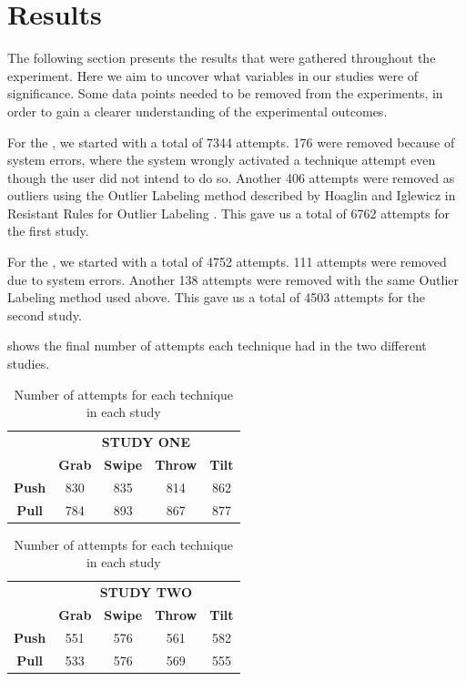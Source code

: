 \section{Results}\label{sec:results}
The following section presents the results that were gathered throughout the experiment.
Here we aim to uncover what variables in our studies were of significance. 
Some data points needed to be removed from the experiments, in order to gain a clearer understanding of the experimental outcomes. 

For the \target, we started with a total of 7344 attempts.
176 were removed because of system errors, where the system wrongly activated a technique attempt even though the user did not intend to do so.
Another 406 attempts were removed as outliers using the Outlier Labeling method described by Hoaglin and Iglewicz in Resistant Rules for Outlier Labeling \cite{Hoaglin:1987}.
This gave us a total of 6762 attempts for the first study.

For the \accuracy, we started with a total of 4752 attempts.
111 attempts were removed due to system errors. 
Another 138 attempts were removed with the same Outlier Labeling method used above.
This gave us a total of 4503 attempts for the second study.

 shows the final number of attempts each technique had in the two different studies.

\begin{table}[H]
	\centering
	\begin{adjustbox}{width=\columnwidth}
		{
			\def\arraystretch{1.5}
			\begin{tabular}{c c c c c}
				& \multicolumn{4}{c}{\textbf{STUDY ONE}} \\
				\cline{2-5}
				& \textbf{Grab} & \textbf{Swipe} & \textbf{Throw} & \textbf{Tilt} \\ \hline
				\textbf{Push} & 830 & 835 & 814 & 862 \\ \hline
				\textbf{Pull} & 784 & 893 & 867 & 877 \\ \hline
			\end{tabular}
		}
		{
			\def\arraystretch{1.5}
			\begin{tabular}{c c c c c}
				& \multicolumn{4}{c}{\textbf{STUDY TWO}} \\
				\cline{2-5}
				& \textbf{Grab} & \textbf{Swipe} & \textbf{Throw} & \textbf{Tilt} \\ \hline
				\textbf{Push} & 551 & 576 & 561 & 582 \\ \hline
				\textbf{Pull} & 533 & 576 & 569 & 555 \\ \hline
			\end{tabular}
		}
	\end{adjustbox}
	\caption{Number of attempts for each technique in each study}
	\label{tab:numberOfAttempts}
\end{table}

